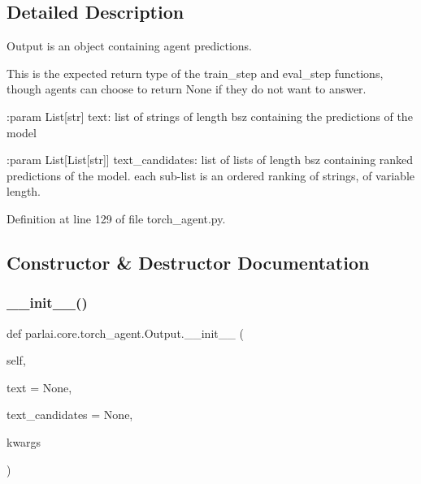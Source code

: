\subsection{Detailed Description}
\begin{DoxyVerb}Output is an object containing agent predictions.

This is the expected return type of the train_step and eval_step functions,
though agents can choose to return None if they do not want to answer.

:param List[str] text:
    list of strings of length bsz containing the predictions of the model

:param List[List[str]] text_candidates:
    list of lists of length bsz containing ranked predictions of the model.
    each sub-list is an ordered ranking of strings, of variable length.
\end{DoxyVerb}
 

Definition at line 129 of file torch\+\_\+agent.\+py.



\subsection{Constructor \& Destructor Documentation}
\mbox{\label{classparlai_1_1core_1_1torch__agent_1_1Output_a490f5e29040c643f20b63c23e7359627}} 
\subsubsection{\texorpdfstring{\+\_\+\+\_\+init\+\_\+\+\_\+()}{\_\_init\_\_()}}
{\footnotesize\ttfamily def parlai.\+core.\+torch\+\_\+agent.\+Output.\+\_\+\+\_\+init\+\_\+\+\_\+ (\begin{DoxyParamCaption}\item[{}]{self,  }\item[{}]{text = {\ttfamily None},  }\item[{}]{text\+\_\+candidates = {\ttfamily None},  }\item[{}]{kwargs }\end{DoxyParamCaption})}



